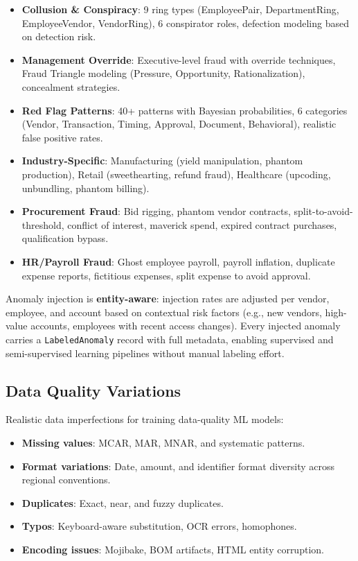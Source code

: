 \documentclass[11pt,a4paper]{article}
\begin{document}
\begin{itemize}[leftmargin=1.4em, itemsep=2pt]
  \item \textbf{Collusion \& Conspiracy}: 9 ring types (EmployeePair, DepartmentRing, EmployeeVendor, VendorRing), 6 conspirator roles, defection modeling based on detection risk.
  \item \textbf{Management Override}: Executive-level fraud with override techniques, Fraud Triangle modeling (Pressure, Opportunity, Rationalization), concealment strategies.
  \item \textbf{Red Flag Patterns}: 40+ patterns with Bayesian probabilities, 6 categories (Vendor, Transaction, Timing, Approval, Document, Behavioral), realistic false positive rates.
  \item \textbf{Industry-Specific}: Manufacturing (yield manipulation, phantom production), Retail (sweethearting, refund fraud), Healthcare (upcoding, unbundling, phantom billing).
  \item \textbf{Procurement Fraud}: Bid rigging, phantom vendor contracts, split-to-avoid-threshold, conflict of interest, maverick spend, expired contract purchases, qualification bypass.
  \item \textbf{HR/Payroll Fraud}: Ghost employee payroll, payroll inflation, duplicate expense reports, fictitious expenses, split expense to avoid approval.
\end{itemize}

Anomaly injection is \textbf{entity-aware}: injection rates are adjusted per
vendor, employee, and account based on contextual risk factors (e.g., new
vendors, high-value accounts, employees with recent access changes). Every
injected anomaly carries a \texttt{LabeledAnomaly} record with full metadata,
enabling supervised and semi-supervised learning pipelines without manual
labeling effort.

\subsection{Data Quality Variations}

Realistic data imperfections for training data-quality ML models:

\begin{itemize}[leftmargin=1.4em, itemsep=2pt]
  \item \textbf{Missing values}: MCAR, MAR, MNAR, and systematic patterns.
  \item \textbf{Format variations}: Date, amount, and identifier format
        diversity across regional conventions.
  \item \textbf{Duplicates}: Exact, near, and fuzzy duplicates.
  \item \textbf{Typos}: Keyboard-aware substitution, OCR errors, homophones.
  \item \textbf{Encoding issues}: Mojibake, BOM artifacts, HTML entity corruption.
\end{itemize}
\end{document}
